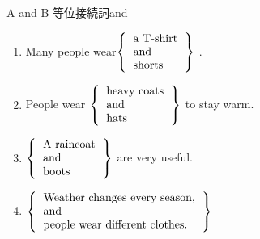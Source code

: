 \documentclass[aspectratio=169,xcolor={dvipsnames,table}]{beamer}
\begin{document}
\begin{frame}[plain]{A and B}
等位接続詞and
\vspace{-5pt}
\begin{enumerate}
 \item<2-> Many people wear$\left\{ 
\begin{tabular}{l}
 a T-shirt\\
 and\\
 shorts\\
\end{tabular}
\right\}$ .
 \item<3-> People wear $\left\{ 
\begin{tabular}{l}
 heavy coats\\
 and\\
 hats\\
\end{tabular}
\right\}$ to stay warm.
 \item<4-> $\left\{ 
\begin{tabular}{l}
 A raincoat\\
 and\\
 boots\\
\end{tabular}
\right\}$
are very useful.
 \item<5-> $\left\{ 
\begin{tabular}{l}
 Weather changes every season,\\
 and\\
 people wear different clothes.\\
\end{tabular}
\right\}$
\end{enumerate} 
 
\end{frame}
\end{document}
